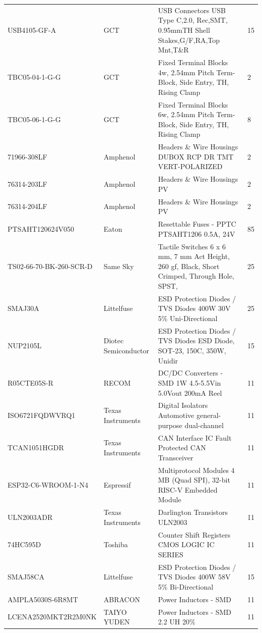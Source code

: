 \begin{landscape}
\begin{center}
\begin{longtable}{@{} p{6cm} p{5cm} p{10cm} p{2cm} @{}}
			USB4105-GF-A & GCT & USB Connectors USB Type C,2.0, Rec,SMT, 0.95mmTH Shell Stakes,G/F,RA,Top Mnt,T\&R & 15 \\
			TBC05-04-1-G-G & GCT & Fixed Terminal Blocks 4w, 2.54mm Pitch Term-Block, Side Entry, TH, Rising Clamp & 2 \\
			TBC05-06-1-G-G & GCT & Fixed Terminal Blocks 6w, 2.54mm Pitch Term-Block, Side Entry, TH, Rising Clamp & 8 \\
			71966-308LF & Amphenol & Headers \& Wire Housings DUBOX RCP DR TMT VERT-POLARIZED & 2 \\
			76314-203LF & Amphenol & Headers \& Wire Housings PV & 2 \\
			76314-204LF & Amphenol & Headers \& Wire Housings PV & 2 \\
			PTSAHT120624V050 & Eaton & Resettable Fuses - PPTC PTSAHT1206 0.5A, 24V & 85 \\
			TS02-66-70-BK-260-SCR-D & Same Sky & Tactile Switches 6 x 6 mm, 7 mm Act Height, 260 gf, Black, Short Crimped, Through Hole, SPST, & 25 \\
			SMAJ30A & Littelfuse & ESD Protection Diodes / TVS Diodes 400W 30V 5\% Uni-Directional & 25 \\
			NUP2105L & Diotec Semiconductor & ESD Protection Diodes / TVS Diodes ESD Diode, SOT-23, 150C, 350W, Unidir & 15 \\
			R05CTE05S-R & RECOM & DC/DC Converters - SMD 1W 4.5-5.5Vin 5.0Vout 200mA Reel & 11 \\
			ISO6721FQDWVRQ1 & Texas Instruments & Digital Isolators Automotive general-purpose dual-channel & 11 \\
			TCAN1051HGDR & Texas Instruments & CAN Interface IC Fault Protected CAN Transceiver & 11 \\
			ESP32-C6-WROOM-1-N4 & Espressif & Multiprotocol Modules 4 MB (Quad SPI), 32-bit RISC-V Embedded Module & 11 \\
			ULN2003ADR & Texas Instruments & Darlington Transistors ULN2003 & 11 \\
			74HC595D & Toshiba & Counter Shift Registers CMOS LOGIC IC SERIES & 11 \\
			SMAJ58CA & Littelfuse & ESD Protection Diodes / TVS Diodes 400W 58V 5\% Bi-Directional & 15 \\
			AMPLA5030S-6R8MT & ABRACON & Power Inductors - SMD & 11 \\
			LCENA2520MKT2R2M0NK & TAIYO YUDEN & Power Inductors - SMD 2.2 UH 20\% & 11 \\
			
		\end{longtable}
	\end{center}
\end{landscape}

